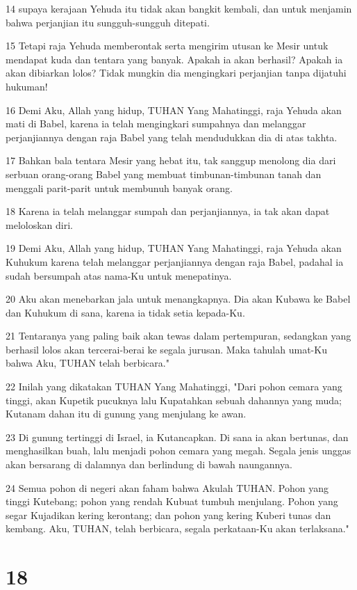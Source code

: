 \par 14 supaya kerajaan Yehuda itu tidak akan bangkit kembali, dan untuk menjamin bahwa perjanjian itu sungguh-sungguh ditepati.
\par 15 Tetapi raja Yehuda memberontak serta mengirim utusan ke Mesir untuk mendapat kuda dan tentara yang banyak. Apakah ia akan berhasil? Apakah ia akan dibiarkan lolos? Tidak mungkin dia mengingkari perjanjian tanpa dijatuhi hukuman!
\par 16 Demi Aku, Allah yang hidup, TUHAN Yang Mahatinggi, raja Yehuda akan mati di Babel, karena ia telah mengingkari sumpahnya dan melanggar perjanjiannya dengan raja Babel yang telah mendudukkan dia di atas takhta.
\par 17 Bahkan bala tentara Mesir yang hebat itu, tak sanggup menolong dia dari serbuan orang-orang Babel yang membuat timbunan-timbunan tanah dan menggali parit-parit untuk membunuh banyak orang.
\par 18 Karena ia telah melanggar sumpah dan perjanjiannya, ia tak akan dapat meloloskan diri.
\par 19 Demi Aku, Allah yang hidup, TUHAN Yang Mahatinggi, raja Yehuda akan Kuhukum karena telah melanggar perjanjiannya dengan raja Babel, padahal ia sudah bersumpah atas nama-Ku untuk menepatinya.
\par 20 Aku akan menebarkan jala untuk menangkapnya. Dia akan Kubawa ke Babel dan Kuhukum di sana, karena ia tidak setia kepada-Ku.
\par 21 Tentaranya yang paling baik akan tewas dalam pertempuran, sedangkan yang berhasil lolos akan tercerai-berai ke segala jurusan. Maka tahulah umat-Ku bahwa Aku, TUHAN telah berbicara."
\par 22 Inilah yang dikatakan TUHAN Yang Mahatinggi, "Dari pohon cemara yang tinggi, akan Kupetik pucuknya lalu Kupatahkan sebuah dahannya yang muda; Kutanam dahan itu di gunung yang menjulang ke awan.
\par 23 Di gunung tertinggi di Israel, ia Kutancapkan. Di sana ia akan bertunas, dan menghasilkan buah, lalu menjadi pohon cemara yang megah. Segala jenis unggas akan bersarang di dalamnya dan berlindung di bawah naungannya.
\par 24 Semua pohon di negeri akan faham bahwa Akulah TUHAN. Pohon yang tinggi Kutebang; pohon yang rendah Kubuat tumbuh menjulang. Pohon yang segar Kujadikan kering kerontang; dan pohon yang kering Kuberi tunas dan kembang. Aku, TUHAN, telah berbicara, segala perkataan-Ku akan terlaksana."

\chapter{18}

